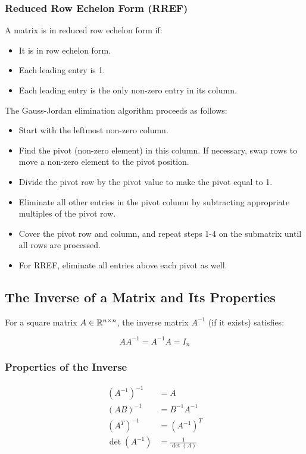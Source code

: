 \subsubsection{Reduced Row Echelon Form (RREF)}

A matrix is in reduced row echelon form if:

\begin{itemize}
    \item It is in row echelon form.
    \item Each leading entry is 1.
    \item Each leading entry is the only non-zero entry in its column.
\end{itemize}

The Gauss-Jordan elimination algorithm proceeds as follows:

\begin{itemize}
    \item Start with the leftmost non-zero column.
    \item Find the pivot (non-zero element) in this column. If necessary, swap rows to move a non-zero element to the pivot position.
    \item Divide the pivot row by the pivot value to make the pivot equal to 1.
    \item Eliminate all other entries in the pivot column by subtracting appropriate multiples of the pivot row.
    \item Cover the pivot row and column, and repeat steps 1-4 on the submatrix until all rows are processed.
    \item For RREF, eliminate all entries above each pivot as well.
\end{itemize}

\subsection{The Inverse of a Matrix and Its Properties}

For a square matrix \(A \in \mathbb{R}^{n \times n}\), the inverse matrix \(A^{-1}\) (if it exists) satisfies:

\[
    A A^{-1} = A^{-1} A = I_n
\]

\subsubsection{Properties of the Inverse}

\begin{align*}
    {(A^{-1})}^{-1} &= A \\
    {(AB)}^{-1} &= B^{-1}A^{-1} \\
    {(A^T)}^{-1} &= {(A^{-1})}^T \\
    \det(A^{-1}) &= \frac{1}{\det(A)}
\end{align*}

